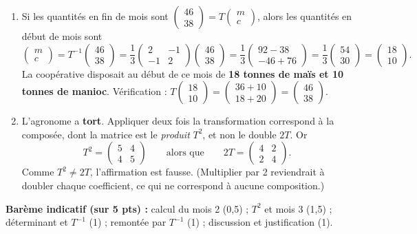 \documentclass[11pt]{article}
\begin{document}
\begin{corrige}
\begin{enumerate}
\item Si les quantités en fin de mois sont $\begin{pmatrix} 46 \\ 38 \end{pmatrix}=T\begin{pmatrix} m \\ c \end{pmatrix}$, alors les quantités en début de mois sont
\[ \begin{pmatrix} m \\ c \end{pmatrix}=T^{-1}\begin{pmatrix} 46 \\ 38 \end{pmatrix}=\frac{1}{3}\begin{pmatrix} 2 & -1 \\ -1 & 2 \end{pmatrix}\begin{pmatrix} 46 \\ 38 \end{pmatrix}=\frac{1}{3}\begin{pmatrix} 92-38 \\ -46+76 \end{pmatrix}=\frac{1}{3}\begin{pmatrix} 54 \\ 30 \end{pmatrix}=\begin{pmatrix} 18 \\ 10 \end{pmatrix}. \]
La coopérative disposait au début de ce mois de \textbf{18 tonnes de maïs et 10 tonnes de manioc}. Vérification : $T\begin{pmatrix} 18 \\ 10 \end{pmatrix}=\begin{pmatrix} 36+10 \\ 18+20 \end{pmatrix}=\begin{pmatrix} 46 \\ 38 \end{pmatrix}$.

\item L'agronome a \textbf{tort}. Appliquer deux fois la transformation correspond à la composée, dont la matrice est le \emph{produit} $T^2$, et non le double $2T$. Or
\[ T^2=\begin{pmatrix} 5 & 4 \\ 4 & 5 \end{pmatrix}\qquad\text{alors que}\qquad 2T=\begin{pmatrix} 4 & 2 \\ 2 & 4 \end{pmatrix}. \]
Comme $T^2\neq2T$, l'affirmation est fausse. (Multiplier par 2 reviendrait à doubler chaque coefficient, ce qui ne correspond à aucune composition.)
\end{enumerate}
\textbf{Barème indicatif (sur 5 pts) :} calcul du mois 2 (0,5) ; $T^2$ et mois 3 (1,5) ; déterminant et $T^{-1}$ (1) ; remontée par $T^{-1}$ (1) ; discussion et justification (1).


\end{corrige}
\end{document}
